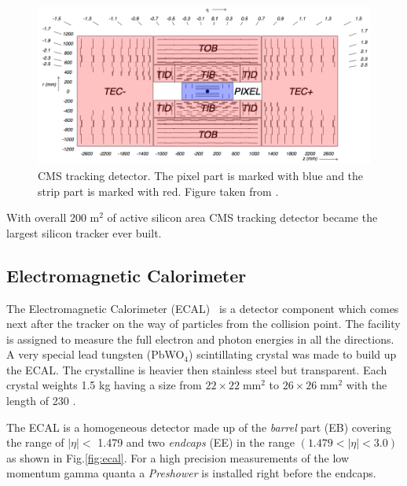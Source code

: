 \begin{figure}[t]
  \centering
  \includegraphics[width=1.1\textwidth]{02_experimental_setup/plots/img_cms_tracker_view.png}
  \caption{CMS tracking detector. The pixel part is marked with blue and the strip part is marked with red. Figure taken from \cite{Lenzi:2013xpa}.}
  \label{fig:tracker}
\end{figure}

With overall 200 m$^2$ of active silicon area CMS tracking detector became the largest silicon tracker ever built. 

\subsection{Electromagnetic Calorimeter}

The Electromagnetic Calorimeter (ECAL)~\cite{ECALtdr, ECALtdradd, CMSatLHC} is a detector component which comes next after the tracker on the way of particles from
the collision point. The facility is assigned to measure the full electron and photon energies in all the directions. 
A very special lead tungsten (PbWO$_{4}$) scintillating crystal was made to build up the ECAL. The crystalline is heavier then stainless steel but transparent. 
Each crystal weights 1.5 kg having a size from $22\times22\;$mm$^2$ to $26\times26\;$mm$^2$ with the length of 230 .

The ECAL is a homogeneous detector made up of the \textit{barrel} part (EB) covering the range of $|\eta| <$ 1.479 and two \textit{endcaps} (EE) in the range $(1.479 < |\eta| < 3.0)$
as shown in Fig.\ref{fig:ecal}. For a high precision measurements of the low momentum gamma quanta a \textit{Preshower} is installed right before 
the endcaps.

